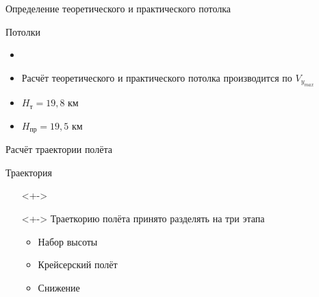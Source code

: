 \begin{frame}{Определение теоретического и практического потолка}
    \begin{minipage}[c]{0.45\textwidth}
        \begin{block}{Потолки}
        \begin{itemize}
            \item <+-> []
            \item <+-> [] Расчёт теоретического и практического потолка производится по $V_{y_{max}}$
            \item <+-> [] $H_\text{т} = 19,8$ км 
            \item <+-> [] $H_\text{пр} = 19,5$ км
        \end{itemize}
        \end{block}
    \end{minipage}
    \begin{minipage}[c]{0.45\textwidth}
    \end{minipage}
\end{frame}

\begin{frame}{Расчёт траектории полёта}
    \begin{block}{Траектория}
    \begin{itemize}
        \item [] <+->
        \item [] <+-> Траеткорию полёта принято разделять на три этапа 
            \begin{itemize}
                \item Набор высоты 
                \item Крейсерский полёт 
                \item Снижение 
            \end{itemize}
    \end{itemize}
    \end{block}
\end{frame}